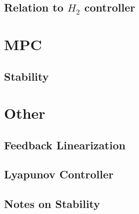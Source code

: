 \subsection{Relation to $H_2$ controller}
\section{MPC}
\subsection{Stability}
\section{Other}
\subsection{Feedback Linearization}
\subsection{Lyapunov Controller}
\subsection{Notes on Stability}